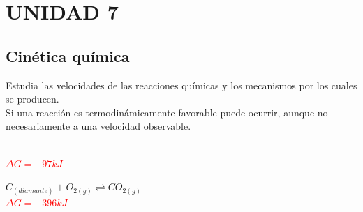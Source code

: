 \saltoPag{} 
\section{UNIDAD 7}
    \subsection{Cinética química}
    \sangria{} Estudia las velocidades de las reacciones químicas y los mecanismos por los cuales se producen. \\
    \sangria{} Si una reacción es termodinámicamente favorable puede ocurrir, aunque no necesariamente a una velocidad observable.
    \begin{center} \\[2pt] \textcolor{red}{$\Delta G = -97kJ$} \end{center} \vspace{5pt}
    \begin{center} $C_{(diamante)} + O_{2(g)} \rightleftharpoons CO_{2(g)}$ \\[2pt] \textcolor{red}{$\Delta G = -396kJ$} \end{center} \vspace{5pt}
